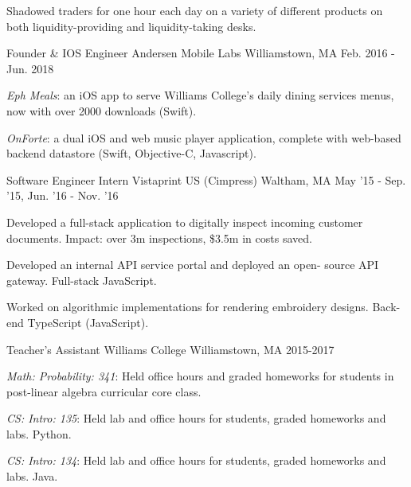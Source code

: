 \begin{cventries}
{\begin{cvitems}
          \item {Shadowed traders for one hour each day on a variety of different products on both liquidity-providing and liquidity-taking desks.}
        \end{cvitems}
      }
    \cventry
      {Founder \& IOS Engineer} %
      {Andersen Mobile Labs} %
      {Williamstown, MA} %
      {Feb. 2016 - Jun. 2018} %
      {
        \begin{cvitems} %
          \item {\textit{Eph Meals}: an iOS app to serve Williams College's daily dining services menus, now with over 2000 downloads (Swift).}
          \item {\textit{OnForte}: a dual iOS and web music player application, complete with web-based backend datastore (Swift, Objective-C, Javascript).}
        \end{cvitems}
      }
  \cventry
    {Software Engineer Intern} %
    {Vistaprint US (Cimpress)} %
    {Waltham, MA} %
    {May '15 - Sep. '15, Jun. '16 - Nov. '16} %
    {
      \begin{cvitems} %
        \item {Developed a full-stack application to digitally inspect incoming customer documents. Impact: over 3m inspections, \$3.5m in costs saved.}
        \item {Developed an internal API service portal and deployed an open- source API gateway. Full-stack JavaScript. }
        \item {Worked on algorithmic implementations for rendering embroidery designs. Back-end TypeScript (JavaScript).}
      \end{cvitems}
    }
\cventry
{Teacher's Assistant}
{Williams College}
{Williamstown, MA}
{2015-2017}
{
\begin{cvitems}
\item \textit{Math: Probability: 341}: Held office hours and graded homeworks for students in post-linear algebra curricular core class.
\item \textit{CS: Intro: 135}: Held lab and office hours for students, graded homeworks and labs. Python.
\item \textit{CS: Intro: 134}: Held lab and office hours for students, graded homeworks and labs. Java.
\end{cvitems}
}

\end{cventries}

